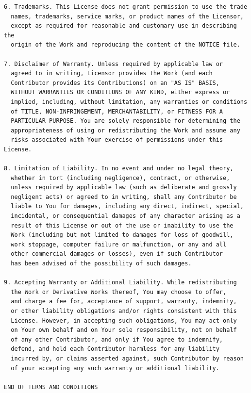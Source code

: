 \begin{verbatim}
6. Trademarks. This License does not grant permission to use the trade
  names, trademarks, service marks, or product names of the Licensor,
  except as required for reasonable and customary use in describing the
  origin of the Work and reproducing the content of the NOTICE file.

7. Disclaimer of Warranty. Unless required by applicable law or
  agreed to in writing, Licensor provides the Work (and each
  Contributor provides its Contributions) on an "AS IS" BASIS,
  WITHOUT WARRANTIES OR CONDITIONS OF ANY KIND, either express or
  implied, including, without limitation, any warranties or conditions
  of TITLE, NON-INFRINGEMENT, MERCHANTABILITY, or FITNESS FOR A
  PARTICULAR PURPOSE. You are solely responsible for determining the
  appropriateness of using or redistributing the Work and assume any
  risks associated with Your exercise of permissions under this License.

8. Limitation of Liability. In no event and under no legal theory,
  whether in tort (including negligence), contract, or otherwise,
  unless required by applicable law (such as deliberate and grossly
  negligent acts) or agreed to in writing, shall any Contributor be
  liable to You for damages, including any direct, indirect, special,
  incidental, or consequential damages of any character arising as a
  result of this License or out of the use or inability to use the
  Work (including but not limited to damages for loss of goodwill,
  work stoppage, computer failure or malfunction, or any and all
  other commercial damages or losses), even if such Contributor
  has been advised of the possibility of such damages.

9. Accepting Warranty or Additional Liability. While redistributing
  the Work or Derivative Works thereof, You may choose to offer,
  and charge a fee for, acceptance of support, warranty, indemnity,
  or other liability obligations and/or rights consistent with this
  License. However, in accepting such obligations, You may act only
  on Your own behalf and on Your sole responsibility, not on behalf
  of any other Contributor, and only if You agree to indemnify,
  defend, and hold each Contributor harmless for any liability
  incurred by, or claims asserted against, such Contributor by reason
  of your accepting any such warranty or additional liability.

END OF TERMS AND CONDITIONS
\end{verbatim}